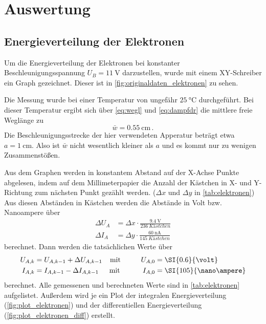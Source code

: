 \section{Auswertung}
\label{sec:Auswertung}

\subsection{Energieverteilung der Elektronen}
\label{ssec:auswwertung_elektronen}

Um die Energieverteilung der Elektronen bei konstanter Beschleunigungsspannung $U_B=\SI{11}{\volt}$ darzustellen, wurde mit einem XY-Schreiber ein Graph gezeichnet. 
Dieser ist in \autoref{fig:originaldaten_elektronen} zu sehen.

Die Messung wurde bei einer Temperatur von ungefähr $\SI{25}{\celsius}$ durchgeführt.
Bei dieser Temperatur ergibt sich über \autoref{eq:wegl} und \autoref{eq:dampfdr} die mittlere freie Weglänge zu
\begin{equation*}
    \bar{w} = \SI{0.55}{\centi\metre} \, .
\end{equation*}
Die Beschleunigungsstrecke der hier verwendeten Apperatur beträgt etwa $a=\SI{1}{\centi\metre}$.
Also ist $\bar{w}$ nicht wesentlich kleiner als $a$ und es kommt nur zu wenigen Zusammenstößen.

Aus dem Graphen werden in konstantem Abstand auf der X-Achse Punkte abgelesen, indem auf dem Millimeterpapier die Anzahl der Kästchen in X- und Y-Richtung zum nächsten Punkt gezählt werden. ($\Delta x$ und $\Delta y$ in \autoref{tab:elektronen})
Aus diesen Abständen in Kästchen werden die Abstände in Volt bzw. Nanoampere über
\begin{align}
    \Delta U_A &= \Delta x \cdot \frac{\SI{9.4}{\volt}}{\SI{236}{Kästchen}} \\
    \Delta I_A &= \Delta y \cdot \frac{\SI{60}{\nano\ampere}}{\SI{145}{Kästchen}}
\end{align}
berechnet.
Dann werden die tatsächlichen Werte über
\begin{align}
    U_{A,k} &= U_{A,k-1} + \Delta U_{A,k-1} &\text{mit\hspace{1cm}} U_{A,0} &= \SI{0.6}{\volt} \\
    I_{A,k} &= I_{A,k-1} - \Delta I_{A,k-1} &\text{mit \hspace{1cm}} I_{A,0} &= \SI{105}{\nano\ampere}
\end{align}
berechnet.
Alle gemessenen und berechneten Werte sind in \autoref{tab:elektronen} aufgelistet.
Außerdem wird je ein Plot der integralen Energieverteilung (\autoref{fig:plot_elektronen}) und der differentiellen Energieverteilung (\autoref{fig:plot_elektronen_diff}) erstellt.

